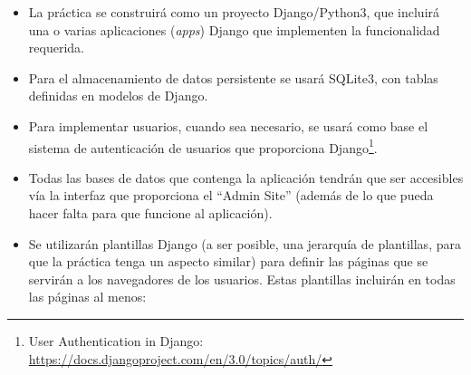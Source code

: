 \begin{itemize}

\item La práctica se construirá como un proyecto Django/Python3, que incluirá una o varias aplicaciones (\emph{apps}) Django que implementen la funcionalidad requerida.

\item Para el almacenamiento de datos persistente se usará SQLite3, con tablas definidas en modelos de Django.

\item Para implementar usuarios, cuando sea necesario, se usará como base el sistema de autenticación de usuarios que proporciona Django\footnote{User Authentication in Django:\\ \url{https://docs.djangoproject.com/en/3.0/topics/auth/}}.

\item Todas las bases de datos que contenga la aplicación tendrán que ser accesibles vía la interfaz que proporciona el ``Admin Site'' (además de lo que pueda hacer falta para que funcione al aplicación).

\item Se utilizarán plantillas Django (a ser posible, una jerarquía de plantillas, para que la práctica tenga un aspecto similar) para definir las páginas que se servirán a los navegadores de los usuarios. Estas plantillas incluirán en todas las páginas al menos:


\end{itemize}
